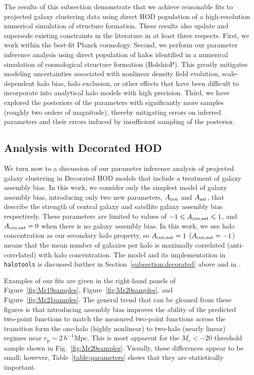 \documentclass[usenatbib,usegraphicx,letterpaper]{mn2e}
\newcommand{\rp}{r_{\mathrm{p}}}
\begin{document}
The results of this subsection demonstrate that we achieve reasonable fits to projected galaxy clustering 
data using direct HOD population of a high-resolution numerical simulation of structure formation. These results 
also update and supersede existing constraints in the literature in at least three respects. First, we work within the 
best-fit Planck cosmology. Second, we perform our parameter inference analysis using direct population of halos 
identified in a numerical simulation of cosmological structure formation (BolshioP). This greatly mitigates modeling 
uncertainties associated with nonlinear density field evolution, scale-dependent halo bias, halo exclusion, 
or other effects that have been difficult to incorporate into analytical halo models with high precision. Third, 
we have explored the posteriors of the parameters with significantly more samples (roughly two orders of magnitude), 
thereby mitigating errors on inferred parameters and their errors induced by insufficient sampling of the 
posterior.

\subsection{Analysis with Decorated HOD}
\label{subsection:ab}

We turn now to a discussion of our parameter inference analysis of projected galaxy clustering 
in Decorated HOD models that include a treatment of galaxy assembly bias. In this work, 
we consider only the simplest model of galaxy assembly bias, introducing only two new 
parameters, $A_{\rm cen}$ and $A_{\rm sat}$, that describe the strength of central galaxy 
and satellite galaxy assembly bias respectively. These parameters are limited to values 
of $-1 \le A_{\rm cen,sat} \le 1$, and $A_{\rm cen,sat}=0$ when there is no galaxy assembly bias. 
In this work, we use halo concentration as our secondary halo property, so $A_{\rm cen,sat}=1$ 
($A_{\rm cen,sat}=-1$) means that the mean number of galaxies per halo is maximally 
correlated (anti-correlated) with halo concentration. The model and its implementation 
in {\tt halotools} is discussed further in Section~\ref{subsection:decorated} above and 
in \citet{hearin_etal16}.

Examples of our fits are given in the right-hand panels of Figure~\ref{fig:Mr19samples}, 
Figure~\ref{fig:Mr20samples}, and Figure~\ref{fig:Mr21samples}. The general trend that 
can be gleaned from these figures is that introducing assembly bias improves the ability 
of the predicted two-point functions to match the measured two-point functions across the 
transition form the one-halo (highly nonlinear) to two-halo (nearly linear) regimes near $\rp \sim 2\, h^{-1}{\mathrm{Mpc}}$. 
This is most apparent for the $M_r < -20$ threshold sample shown in Fig.~\ref{fig:Mr20samples}. 
Visually, these differences appear to be small; however, Table~\ref{table:parameters} shows that 
they are statistically important.
\end{document}
